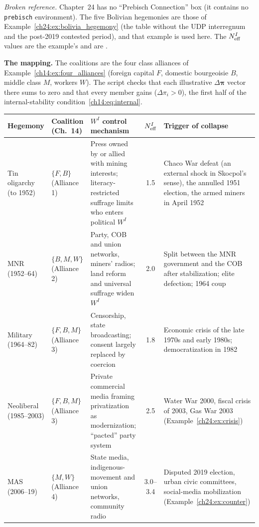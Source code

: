 \documentclass[../solutions_manual.tex]{subfiles}
\begin{document}

\emph{Broken reference.} Chapter~24 has no ``Prebisch Connection'' box (it contains no \texttt{prebisch} environment). The five Bolivian hegemonies are those of Example~\ref{ch24:ex:bolivia_hegemony} (the table without the UDP interregnum and the post-2019 contested period), and that example is used here. The $N_{\text{eff}}^I$ values are the example's and are \illustrative.

 \textbf{The mapping.} The coalitions are the four class alliances of Example~\ref{ch14:ex:four_alliances} (foreign capital $F$, domestic bourgeoisie $B$, middle class $M$, workers $W$). The script checks that each illustrative $\Delta\boldsymbol{\pi}$ vector there sums to zero and that every member gains ($\Delta\pi_i > 0$), the first half of the internal-stability condition~\eqref{ch14:eq:internal}.
\begin{center}
\small
\begin{tabular}{p{2.1cm}p{2.0cm}p{4.1cm}cp{3.6cm}}
\toprule
Hegemony & Coalition (Ch.~14) & $W^I$ control mechanism & $N_{\text{eff}}^I$ & Trigger of collapse \\
\midrule
Tin oligarchy (to 1952) & $\{F,B\}$ (Alliance 1) & Press owned by or allied with mining interests; literacy-restricted suffrage limits who enters political $W^I$ & 1.5 & Chaco War defeat (an external shock in Skocpol's sense), the annulled 1951 election, the armed miners in April 1952 \\
MNR (1952--64) & $\{B,M,W\}$ (Alliance 2) & Party, COB and union networks, miners' radios; land reform and universal suffrage widen $W^I$ & 2.0 & Split between the MNR government and the COB after stabilization; elite defection; 1964 coup \\
Military (1964--82) & $\{F,B,M\}$ (Alliance 3) & Censorship, state broadcasting; consent largely replaced by coercion & 1.8 & Economic crisis of the late 1970s and early 1980s; democratization in 1982 \\
Neoliberal (1985--2003) & $\{F,B,M\}$ (Alliance 3) & Private commercial media framing privatization as modernization; ``pacted'' party system & 2.5 & Water War 2000, fiscal crisis of 2003, Gas War 2003 (Example~\ref{ch24:ex:crisis}) \\
MAS (2006--19) & $\{M,W\}$ (Alliance 4) & State media, indigenous-movement and union networks, community radio & 3.0--3.4 & Disputed 2019 election, urban civic committees, social-media mobilization (Example~\ref{ch24:ex:counter}) \\
\bottomrule
\end{tabular}
\end{center}
\end{document}
